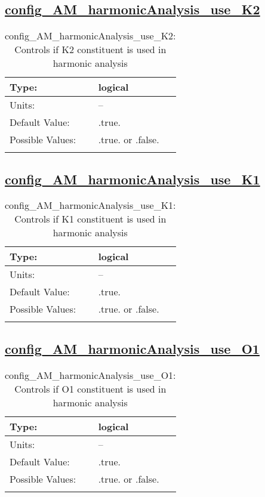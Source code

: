 \subsection[config\_AM\_harmonicAnalysis\_use\_K2]{\hyperref[sec:nm_tab_AM_harmonicAnalysis]{config\_AM\_harmonicAnalysis\_use\_K2}}
\label{subsec:nm_sec_config_AM_harmonicAnalysis_use_K2}
\begin{center}
\begin{longtable}{| p{2.0in} || p{4.0in} |}
    \hline
    Type: & logical \\
    \hline
    Units: & -- \\
    \hline
    Default Value: & .true. \\
    \hline
    Possible Values: & .true. or .false. \\
    \hline
    \caption{config\_AM\_harmonicAnalysis\_use\_K2: Controls if K2 constituent is used in harmonic analysis}
\end{longtable}
\end{center}
\subsection[config\_AM\_harmonicAnalysis\_use\_K1]{\hyperref[sec:nm_tab_AM_harmonicAnalysis]{config\_AM\_harmonicAnalysis\_use\_K1}}
\label{subsec:nm_sec_config_AM_harmonicAnalysis_use_K1}
\begin{center}
\begin{longtable}{| p{2.0in} || p{4.0in} |}
    \hline
    Type: & logical \\
    \hline
    Units: & -- \\
    \hline
    Default Value: & .true. \\
    \hline
    Possible Values: & .true. or .false. \\
    \hline
    \caption{config\_AM\_harmonicAnalysis\_use\_K1: Controls if K1 constituent is used in harmonic analysis}
\end{longtable}
\end{center}
\subsection[config\_AM\_harmonicAnalysis\_use\_O1]{\hyperref[sec:nm_tab_AM_harmonicAnalysis]{config\_AM\_harmonicAnalysis\_use\_O1}}
\label{subsec:nm_sec_config_AM_harmonicAnalysis_use_O1}
\begin{center}
\begin{longtable}{| p{2.0in} || p{4.0in} |}
    \hline
    Type: & logical \\
    \hline
    Units: & -- \\
    \hline
    Default Value: & .true. \\
    \hline
    Possible Values: & .true. or .false. \\
    \hline
    \caption{config\_AM\_harmonicAnalysis\_use\_O1: Controls if O1 constituent is used in harmonic analysis}
\end{longtable}
\end{center}
